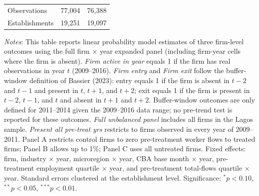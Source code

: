 \begin{table}[H]
\begin{tabular}{lcc}
Observations   & 77,004 & 76,388 \\
Establishments & 19,251 & 19,097 \\
\bottomrule
\end{tabular}
\begin{minipage}{\textwidth}
\footnotesize
\medskip
\textit{Notes}: This table reports linear probability model estimates of three firm-level outcomes using the full firm $\times$ year expanded panel (including firm-year cells where the firm is absent). \textit{Firm active in year} equals 1 if the firm has real observations in year $t$ (2009--2016). \textit{Firm entry} and \textit{Firm exit} follow the buffer-window definition of Bassier (2023): entry equals 1 if the firm is absent in $t-2$ and $t-1$ and present in $t$, $t+1$, and $t+2$; exit equals 1 if the firm is present in $t-2$, $t-1$, and $t$ and absent in $t+1$ and $t+2$. Buffer-window outcomes are only defined for 2011--2014 given the 2009--2016 data range; no pre-trend test is reported for these outcomes. \textit{Full unbalanced panel} includes all firms in the Lagos sample. \textit{Present all pre-treat yrs} restricts to firms observed in every year of 2009--2011. Panel A restricts control firms to zero pre-treatment worker flows to treated firms; Panel B allows up to 1\%; Panel C uses all untreated firms. Fixed effects: firm, industry $\times$ year, microregion $\times$ year, CBA base month $\times$ year, pre-treatment employment quartile $\times$ year, and pre-treatment total-flows quartile $\times$ year. Standard errors clustered at the establishment level. Significance: $^{*}p{<}0.10$, $^{**}p{<}0.05$, $^{***}p{<}0.01$.
\end{minipage}
\end{table}
